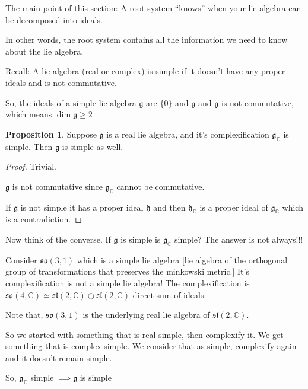 \documentclass{article}
\theoremstyle{definition}
\newtheorem{proposition}{Proposition}
\begin{document}
The main point of this section: A root system ``knows'' when your lie algebra can be decomposed into ideals.

In other words, the root system contains all the information we need to know about the lie algebra.

\underline{Recall:} A lie algebra (real or complex) is \underline{simple} if it doesn't have any proper ideals and is not commutative.

So, the ideals of a simple lie algebra \(\mathfrak{g}\) are \(\{ 0 \} \) and \(\mathfrak{g} \) and \(\mathfrak{g} \) is not commutative, which means \(\dim \mathfrak{g} \geq 2 \) 

\begin{proposition}
    Suppose \(\mathfrak{g} \) is a real lie algebra, and it's complexification \(\mathfrak{g}_\mathbb{C} \) is simple. Then \(\mathfrak{g} \) is simple as well. 
\end{proposition}

\begin{proof}
    Trivial.
    
    \(\mathfrak{g} \) is not commutative since \(\mathfrak{g}_\mathbb{C} \) cannot be commutative.

    If \(\mathfrak{g} \) is not simple it has a proper ideal \(\mathfrak{h} \) and then \(\mathfrak{h}_\mathbb{C} \) is a proper ideal of \(\mathfrak{g}_\mathbb{C} \) which is a contradiction.    

\end{proof}

Now think of the converse. If \(\mathfrak{g} \) is simple is \(\mathfrak{g}_\mathbb{C} \) simple? The answer is not always!!!

Consider \(\mathfrak{so}(3,1)\) which is a simple lie algebra [lie algebra of the orthogonal group of transformations that preserves the minkowski metric.] It's complexification is not a simple lie algebra! The complexification is \(\mathfrak{so}(4,\mathbb{C})\simeq \mathfrak{sl}(2,\mathbb{C})\oplus \mathfrak{sl}(2,\mathbb{C} )   \)  direct sum of ideals.

Note that, \(\mathfrak{so}(3,1)\) is the underlying real lie algebra of \(\mathfrak{sl}(2,\mathbb{C}) \). 

So we started with something that is real simple, then complexify it. We get something that is complex simple. We consider that as simple, complexify again and it doesn't remain simple.

So, \(\mathfrak{g}_\mathbb{C}\) simple \(\implies \mathfrak{g} \) is simple
\end{document}
